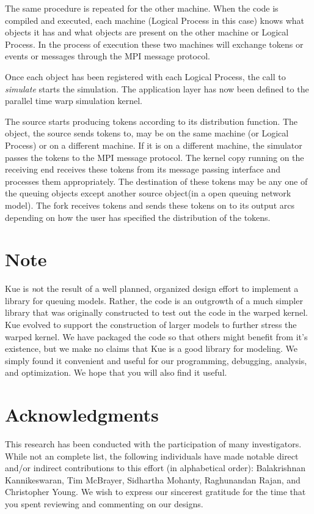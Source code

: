 \documentclass[11pt]{report}
\begin{document}
The same procedure is repeated for the other machine.  When the code is
compiled and executed, each machine (Logical Process in this case) knows
what objects it has and what objects are present on the other machine or
Logical Process.  In the process of execution these two machines will
exchange tokens or events or messages through the MPI message protocol.
  
Once each object has been registered with each Logical Process, the call
to {\it simulate} starts the simulation.  The application layer has now
been defined to the parallel time warp simulation kernel.

The source starts producing tokens according to its distribution
function.  The object, the source sends tokens to, may be on the same
machine (or Logical Process) or on a different machine.  If it is on a
different machine, the simulator passes the tokens to the MPI message
protocol.  The kernel copy running on the receiving end receives these
tokens from its message passing interface and processes them
appropriately.  The destination of these tokens may be any one of the
queuing objects except another source object(in a open queuing network
model).  The fork receives tokens and sends these tokens on to its
output arcs depending on how the user has specified the distribution of
the tokens.

\chapter{Note}

Kue is {\emph not} the result of a well planned, organized design effort
to implement a library for queuing models.  Rather, the code is an
outgrowth of a much simpler library that was originally constructed to
test out the code in the {\sc warped} kernel.  Kue evolved to support the
construction of larger models to further stress the {\sc warped} kernel.
We have packaged the code so that others might benefit from it's
existence, but we make no claims that Kue is a good library for
modeling.  We simply found it convenient and useful for our programming,
debugging, analysis, and optimization.  We hope that you will also
find it useful.

\chapter*{Acknowledgments}

This research has been conducted with the participation of many
investigators.  While not an complete list, the following individuals
have made notable direct and/or indirect contributions to this effort
(in alphabetical order): Balakrishnan Kannikeswaran, Tim McBrayer,
Sidhartha Mohanty, Raghunandan Rajan, and Christopher Young.  We wish to
express our sincerest gratitude for the time that you spent reviewing
and commenting on our designs.
\end{document}
